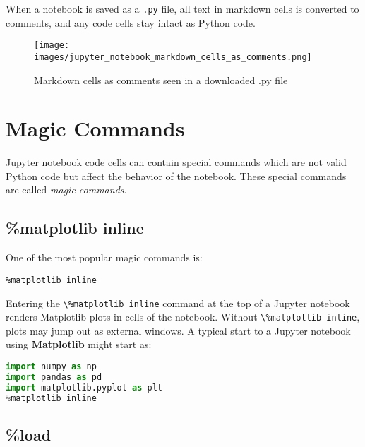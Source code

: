 \documentclass{book}
\makeatletter
\def\maxwidth{\ifdim\Gin@nat@width>\linewidth\linewidth
\else\Gin@nat@width\fi}
\let\Oldincludegraphics\includegraphics
\renewcommand{\includegraphics}[1]{\Oldincludegraphics[width=.8\maxwidth]{#1}}
\newcommand{\passthrough}[1]{#1}
\makeatother
\begin{document}
When a notebook is saved as a \passthrough{\lstinline!.py!} file, all
text in markdown cells is converted to comments, and any code cells stay
intact as Python code.

\begin{figure}
\centering
\texttt{[image: images/jupyter\_notebook\_markdown\_cells\_as\_comments.png]}
\caption{Markdown cells as comments seen in a downloaded .py file}
\end{figure}
    




    
        \hypertarget{magic-commands}{%
\section{Magic Commands}\label{magic-commands}}
    




    
        Jupyter notebook code cells can contain special commands which are not
valid Python code but affect the behavior of the notebook. These special
commands are called \emph{magic commands}.
    




    
        \hypertarget{matplotlib-inline}{%
\subsection{\%matplotlib inline}\label{matplotlib-inline}}

One of the most popular magic commands is:

\begin{lstlisting}
%matplotlib inline
\end{lstlisting}

Entering the \passthrough{\lstinline!\%matplotlib inline!} command at
the top of a Jupyter notebook renders Matplotlib plots in cells of the
notebook. Without \passthrough{\lstinline!\%matplotlib inline!}, plots
may jump out as external windows. A typical start to a Jupyter notebook
using \textbf{Matplotlib} might start as:

\begin{lstlisting}[language=Python]
import numpy as np
import pandas as pd
import matplotlib.pyplot as plt
%matplotlib inline
\end{lstlisting}
    




    
        \hypertarget{load}{%
\subsection{\%load}\label{load}}
\end{document}
